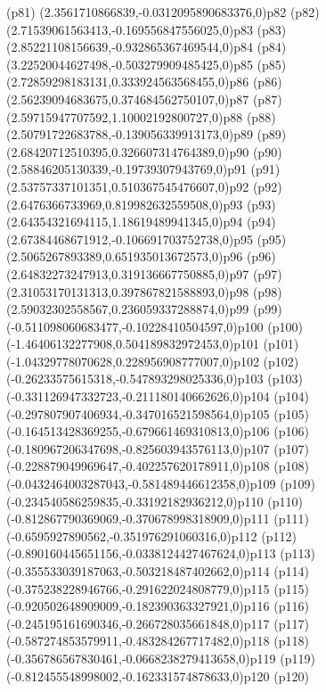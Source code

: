 \psdot(p81)
\psPoint(2.3561710866839,-0.0312095890683376,0){p82}
\psdot(p82)
\psPoint(2.71539061563413,-0.169556847556025,0){p83}
\psdot(p83)
\psPoint(2.85221108156639,-0.932865367469544,0){p84}
\psdot(p84)
\psPoint(3.22520044627498,-0.503279909485425,0){p85}
\psdot(p85)
\psPoint(2.72859298183131,0.333924563568455,0){p86}
\psdot(p86)
\psPoint(2.56239094683675,0.374684562750107,0){p87}
\psdot(p87)
\psPoint(2.59715947707592,1.10002192800727,0){p88}
\psdot(p88)
\psPoint(2.50791722683788,-0.139056339913173,0){p89}
\psdot(p89)
\psPoint(2.68420712510395,0.326607314764389,0){p90}
\psdot(p90)
\psPoint(2.58846205130339,-0.19739307943769,0){p91}
\psdot(p91)
\psPoint(2.53757337101351,0.510367545476607,0){p92}
\psdot(p92)
\psPoint(2.6476366733969,0.819982632559508,0){p93}
\psdot(p93)
\psPoint(2.64354321694115,1.18619489941345,0){p94}
\psdot(p94)
\psPoint(2.67384468671912,-0.106691703752738,0){p95}
\psdot(p95)
\psPoint(2.5065267893389,0.651935013672573,0){p96}
\psdot(p96)
\psPoint(2.64832273247913,0.319136667750885,0){p97}
\psdot(p97)
\psPoint(2.31053170131313,0.397867821588893,0){p98}
\psdot(p98)
\psPoint(2.59032302558567,0.236059337288874,0){p99}
\psdot(p99)
\psPoint(-0.511098060683477,-0.10228410504597,0){p100}
\psdot(p100)
\psPoint(-1.46406132277908,0.504189832972453,0){p101}
\psdot(p101)
\psPoint(-1.04329778070628,0.228956908777007,0){p102}
\psdot(p102)
\psPoint(-0.26233575615318,-0.547893298025336,0){p103}
\psdot(p103)
\psPoint(-0.331126947332723,-0.211180140662626,0){p104}
\psdot(p104)
\psPoint(-0.297807907406934,-0.347016521598564,0){p105}
\psdot(p105)
\psPoint(-0.164513428369255,-0.679661469310813,0){p106}
\psdot(p106)
\psPoint(-0.180967206347698,-0.825603943576113,0){p107}
\psdot(p107)
\psPoint(-0.228879049969647,-0.402257620178911,0){p108}
\psdot(p108)
\psPoint(-0.0432464003287043,-0.581489446612358,0){p109}
\psdot(p109)
\psPoint(-0.234540586259835,-0.33192182936212,0){p110}
\psdot(p110)
\psPoint(-0.812867790369069,-0.370678998318909,0){p111}
\psdot(p111)
\psPoint(-0.6595927890562,-0.351976291060316,0){p112}
\psdot(p112)
\psPoint(-0.890160445651156,-0.0338124427467624,0){p113}
\psdot(p113)
\psPoint(-0.355533039187063,-0.503218487402662,0){p114}
\psdot(p114)
\psPoint(-0.375238228946766,-0.291622024808779,0){p115}
\psdot(p115)
\psPoint(-0.920502648909009,-0.182390363327921,0){p116}
\psdot(p116)
\psPoint(-0.245195161690346,-0.266728035661848,0){p117}
\psdot(p117)
\psPoint(-0.587274853579911,-0.483284267717482,0){p118}
\psdot(p118)
\psPoint(-0.356786567830461,-0.0668238279413658,0){p119}
\psdot(p119)
\psPoint(-0.812455548998002,-0.162331574878633,0){p120}
\psdot(p120)
